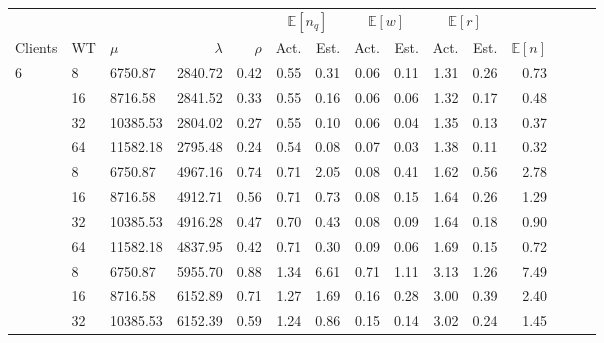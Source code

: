        \begin{table}
            \footnotesize{
                \begin{tabular}{lllrrrrrrrrrrrr}
                    \toprule
                    & & & & & \multicolumn{2}{c}{$\mathbb{E}[n_q]$} & \multicolumn{2}{c}{$\mathbb{E}[w]$} & \multicolumn{2}{c}{$\mathbb{E}[r]$} & \\
                    \cmidrule(lr){6-7}
                    \cmidrule(lr){8-9}
                    \cmidrule(lr){10-11}
                    Clients & WT & $\mu$        & $\lambda$ & $\rho$ & Act.   & Est.   & Act.  & Est.  & Act.  & Est.  & $\mathbb{E}[n]$ \\
                    \midrule
                    6       & 8  & 6750.87  & 2840.72   & 0.42   & 0.55   & 0.31   & 0.06  & 0.11  & 1.31  & 0.26  & 0.73    \\
                            & 16 & 8716.58  & 2841.52   & 0.33   & 0.55   & 0.16   & 0.06  & 0.06  & 1.32  & 0.17  & 0.48    \\
                            & 32 & 10385.53 & 2804.02   & 0.27   & 0.55   & 0.10   & 0.06  & 0.04  & 1.35  & 0.13  & 0.37    \\
                            & 64 & 11582.18 & 2795.48   & 0.24   & 0.54   & 0.08   & 0.07  & 0.03  & 1.38  & 0.11  & 0.32    \\
                    \addlinespace
                    12      & 8  & 6750.87  & 4967.16   & 0.74   & 0.71   & 2.05   & 0.08  & 0.41  & 1.62  & 0.56  & 2.78    \\
                            & 16 & 8716.58  & 4912.71   & 0.56   & 0.71   & 0.73   & 0.08  & 0.15  & 1.64  & 0.26  & 1.29    \\
                            & 32 & 10385.53 & 4916.28   & 0.47   & 0.70   & 0.43   & 0.08  & 0.09  & 1.64  & 0.18  & 0.90    \\
                            & 64 & 11582.18 & 4837.95   & 0.42   & 0.71   & 0.30   & 0.09  & 0.06  & 1.69  & 0.15  & 0.72    \\
                    \addlinespace
                    24      & 8  & 6750.87  & 5955.70   & 0.88   & 1.34   & 6.61   & 0.71  & 1.11  & 3.13  & 1.26  & 7.49    \\
                            & 16 & 8716.58  & 6152.89   & 0.71   & 1.27   & 1.69   & 0.16  & 0.28  & 3.00  & 0.39  & 2.40    \\
                            & 32 & 10385.53 & 6152.39   & 0.59   & 1.24   & 0.86   & 0.15  & 0.14  & 3.02  & 0.24  & 1.45    \\

\end{tabular}}
\end{table}
